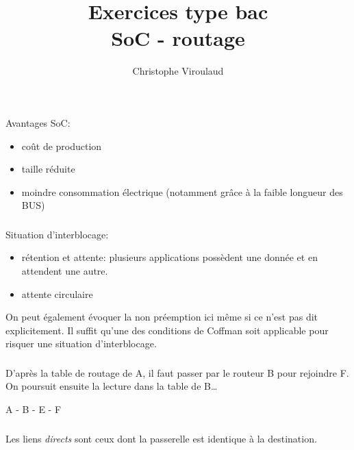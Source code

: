 \documentclass[svgnames,11pt]{beamer}
\author[]{Christophe Viroulaud}
\title{Exercices type bac\\SoC - routage}
\date{\framebox{\textbf{Archi 19}}}
\institute{Terminale - NSI}
\begin{document}
\begin{frame}
\titlepage
\end{frame}
\begin{frame}
    \frametitle{}

    Avantages SoC:
    \begin{itemize}
        \item coût de production 
        \item taille réduite
        \item moindre consommation électrique (notamment grâce à la faible longueur des BUS)
    \end{itemize}

\end{frame}
\begin{frame}
    \frametitle{}

    Situation d'interblocage:
    \begin{itemize}
        \item rétention et attente: plusieurs applications possèdent une donnée et en attendent une autre.
        \item attente circulaire 
    \end{itemize}
    On peut également évoquer la non préemption ici même si ce n'est pas dit explicitement. Il suffit qu'une des conditions de Coffman soit applicable pour risquer une situation d'interblocage.

\end{frame}
\begin{frame}
    \frametitle{}
D'après la table de routage de A, il faut passer par le routeur B pour rejoindre F. On poursuit ensuite la lecture dans la table de B\dots
    \begin{center}
        A - B - E - F
    \end{center}

\end{frame}
\begin{frame}
    \frametitle{}
Les liens \emph{directs} sont ceux dont la passerelle est identique à la destination.
    \begin{center}
    \end{center}

\end{frame}
\end{document}
